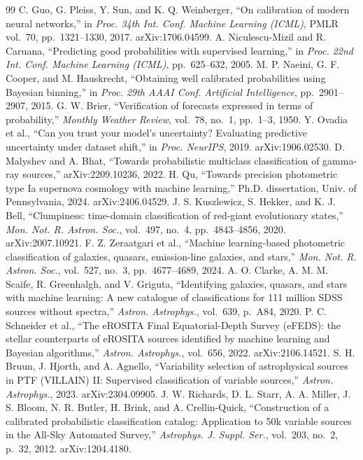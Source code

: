 \documentclass[conference]{IEEEtran}
\begin{document}
\begin{thebibliography}{99}
 C. Guo, G. Pleiss, Y. Sun, and K. Q. Weinberger, ``On calibration of modern neural networks,'' in \emph{Proc. 34th Int. Conf. Machine Learning (ICML)}, PMLR vol.~70, pp.~1321--1330, 2017. arXiv:1706.04599.
 A. Niculescu-Mizil and R. Caruana, ``Predicting good probabilities with supervised learning,'' in \emph{Proc. 22nd Int. Conf. Machine Learning (ICML)}, pp.~625--632, 2005.
 M. P. Naeini, G. F. Cooper, and M. Hauskrecht, ``Obtaining well calibrated probabilities using Bayesian binning,'' in \emph{Proc. 29th AAAI Conf. Artificial Intelligence}, pp.~2901--2907, 2015.
 G. W. Brier, ``Verification of forecasts expressed in terms of probability,'' \emph{Monthly Weather Review}, vol.~78, no.~1, pp.~1--3, 1950.
 Y. Ovadia et al., ``Can you trust your model's uncertainty? Evaluating predictive uncertainty under dataset shift,'' in \emph{Proc. NeurIPS}, 2019. arXiv:1906.02530.
 D. Malyshev and A. Bhat, ``Towards probabilistic multiclass classification of gamma-ray sources,'' arXiv:2209.10236, 2022.
 H. Qu, ``Towards precision photometric type Ia supernova cosmology with machine learning,'' Ph.D. dissertation, Univ. of Pennsylvania, 2024. arXiv:2406.04529.
 J. S. Kuszlewicz, S. Hekker, and K. J. Bell, ``Clumpiness: time-domain classification of red-giant evolutionary states,'' \emph{Mon. Not. R. Astron. Soc.}, vol.~497, no.~4, pp.~4843--4856, 2020. arXiv:2007.10921.
 F. Z. Zeraatgari et al., ``Machine learning-based photometric classification of galaxies, quasars, emission-line galaxies, and stars,'' \emph{Mon. Not. R. Astron. Soc.}, vol.~527, no.~3, pp.~4677--4689, 2024.
 A. O. Clarke, A. M. M. Scaife, R. Greenhalgh, and V. Griguta, ``Identifying galaxies, quasars, and stars with machine learning: A new catalogue of classifications for 111 million SDSS sources without spectra,'' \emph{Astron. Astrophys.}, vol.~639, p.~A84, 2020.
 P. C. Schneider et al., ``The eROSITA Final Equatorial-Depth Survey (eFEDS): the stellar counterparts of eROSITA sources identified by machine learning and Bayesian algorithms,'' \emph{Astron. Astrophys.}, vol.~656, 2022. arXiv:2106.14521.
 S. H. Bruun, J. Hjorth, and A. Agnello, ``Variability selection of astrophysical sources in PTF (VILLAIN) II: Supervised classification of variable sources,'' \emph{Astron. Astrophys.}, 2023. arXiv:2304.09905.
 J. W. Richards, D. L. Starr, A. A. Miller, J. S. Bloom, N. R. Butler, H. Brink, and A. Crellin-Quick, ``Construction of a calibrated probabilistic classification catalog: Application to 50k variable sources in the All-Sky Automated Survey,'' \emph{Astrophys. J. Suppl. Ser.}, vol.~203, no.~2, p.~32, 2012. arXiv:1204.4180.
\end{thebibliography}
\end{document}

